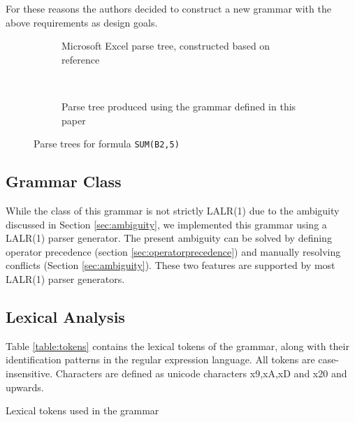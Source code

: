\documentclass[times]{smrauth}
\begin{document}
For these reasons the authors decided to construct a new grammar with the above requirements as design goals.

\begin{figure}
	\centering
	\begin{subfigure}[b]{0.45\textwidth}
		\centering
		\hspace{-2em}
		\scalebox{.7}{
			
		}
		\caption{Microsoft Excel parse tree, constructed based on reference \cite{ExcelOfficialGrammar}}
	\end{subfigure}
	~
	\begin{subfigure}[b]{0.45\textwidth}
		\centering
		\vspace{1em}
		\hspace{-0.5em}
		\scalebox{.7}{
			
		}
		\caption{Parse tree produced using the grammar defined in this paper}
		\label{figure:ourparsetree}
	\end{subfigure}
	\caption{Parse trees for formula \texttt{SUM(B2,5)}}
	\label{figure:parsetrees}
\end{figure}

\subsection{Grammar Class}

While the class of this grammar is not strictly LALR(1) due to the ambiguity discussed in Section \ref{sec:ambiguity}, we implemented this grammar using a LALR(1) parser generator.
The present ambiguity can be solved by defining operator precedence (section \ref{sec:operatorprecedence}) and manually resolving conflicts (Section \ref{sec:ambiguity}).
These two features are supported by most LALR(1) parser generators.

\subsection{Lexical Analysis}
Table \ref{table:tokens} contains the lexical tokens of the grammar, along with their identification patterns in the regular expression language. All tokens are case-insensitive.
Characters are defined as unicode characters x9,xA,xD and x20 and upwards.

\begin{table}
	\vspace{2mm}
	\caption{Lexical tokens used in the grammar}
	\label{table:tokens}
	\centering
	
\end{table}
\end{document}
